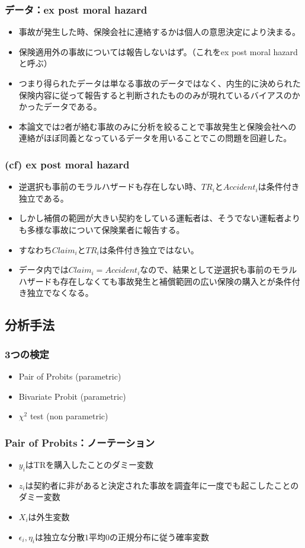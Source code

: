 \documentclass[dvipdfmx, 12pt]{beamer}
\begin{document}
\begin{frame}\frametitle{データ：ex post moral hazard}
	\begin{itemize}
	\item 事故が発生した時、保険会社に連絡するかは個人の意思決定により決まる。
	\item 保険適用外の事故については報告しないはず。（これをex post moral hazardと呼ぶ）
	\item つまり得られたデータは単なる事故のデータではなく、内生的に決められた保険内容に従って報告すると判断されたもののみが現れているバイアスのかかったデータである。
	\item 本論文では2者が絡む事故のみに分析を絞ることで事故発生と保険会社への連絡がほぼ同義となっているデータを用いることでこの問題を回避した。
	\end{itemize}
\end{frame}

\begin{frame}\frametitle{(cf) ex post moral hazard}
	\begin{itemize}
	\item 逆選択も事前のモラルハザードも存在しない時、$TR_i$と$Accident_i$は条件付き独立である。
	\item しかし補償の範囲が大きい契約をしている運転者は、そうでない運転者よりも多様な事故について保険業者に報告する。
	\item すなわち$Claim_i$と$TR_i$は条件付き独立ではない。
	\item データ内では$Claim_i = Accident_i$なので、結果として逆選択も事前のモラルハザードも存在しなくても事故発生と補償範囲の広い保険の購入とが条件付き独立でなくなる。
	\end{itemize}
\end{frame}


\subsection{分析手法}
\begin{frame}\frametitle{3つの検定}
	\begin{itemize}
	\item Pair of Probits (parametric)
	\item Bivariate Probit (parametric)
	\item $\chi^2$ test (non parametric)
	\end{itemize}
\end{frame}

\begin{frame}\frametitle{Pair of Probits：ノーテーション}
	\begin{itemize}
	\item $y_i$はTRを購入したことのダミー変数
	\item $z_i$は契約者に非があると決定された事故を調査年に一度でも起こしたことのダミー変数
	\item $X_i$は外生変数
	\item $\epsilon_i, \eta_i$は独立な分散$1$平均$0$の正規分布に従う確率変数
	\end{itemize}
\end{frame}
\end{document}
